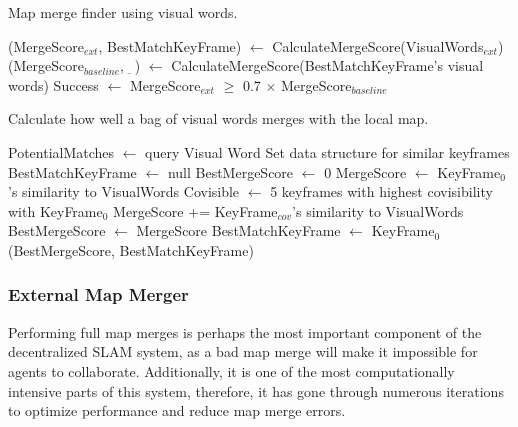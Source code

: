 \begin{algorithm}[H]
    \caption{Map merge finder using visual words.}
    \label{alg:map-merge-finder}
    \begin{algorithmic}[1]
        \State (MergeScore$_{ext}$, BestMatchKeyFrame) $\gets$ CalculateMergeScore(VisualWords$_{ext}$)
        \State (MergeScore$_{baseline}$, $\underbar{\ \ }$) $\gets$ CalculateMergeScore(BestMatchKeyFrame's visual words)
        \State Success $\gets$ MergeScore$_{ext}$ $\geq$ 0.7 $\times$ MergeScore$_{baseline}$
    \end{algorithmic}
\end{algorithm}
\vspace{-0.25in}
\begin{algorithm}[H]
    \caption{Calculate how well a bag of visual words merges with the local map.}
    \label{alg:calculate-merge-score}
    \begin{algorithmic}[1]
        \State PotentialMatches $\gets$ query Visual Word Set data structure for similar keyframes
        \State BestMatchKeyFrame $\gets$ null
        \State BestMergeScore $\gets$ 0
        \State MergeScore $\gets$ KeyFrame$_0$'s similarity to VisualWords
        \State Covisible $\gets$ 5 keyframes with highest covisibility with KeyFrame$_0$
         
        \State MergeScore += KeyFrame$_{cov}$'s similarity to VisualWords
        \EndFor
        \State BestMergeScore $\gets$ MergeScore
        \State BestMatchKeyFrame $\gets$ KeyFrame$_0$
        \EndIf
        \EndFor
        \Return (BestMergeScore, BestMatchKeyFrame)
        \EndProcedure
    \end{algorithmic}
\end{algorithm}

\subsubsection{External Map Merger}
\label{sec:external-map-merger}
Performing full map merges is perhaps the most important component of the decentralized SLAM system, as a bad map merge will make it impossible for agents to collaborate. Additionally, it is one of the most computationally intensive parts of this system, therefore, it has gone through numerous iterations to optimize performance and reduce map merge errors.


